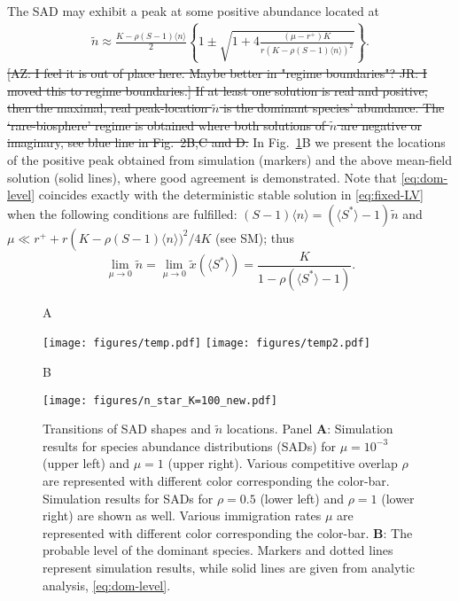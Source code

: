 \documentclass[9pt,twocolumn,twoside,lineno]{pnas-new}
\begin{document}
The SAD may exhibit a peak at some positive abundance %
located at
\begin{eqnarray}
    \label{eq:dom-level}
    \tilde{n}\approx
    \frac{K-\rho(S-1)\langle n\rangle}{2}\left\{1 \pm \sqrt{1+4\frac{(\mu-r^+) K}{r(K-\rho(S-1)\langle n\rangle)^2}}\right\}.
\end{eqnarray}
\st{[AZ: I feel it is out of place here. Maybe better in "regime boundaries"? JR: I moved this to regime boundaries.]
If at least one solution is real and positive, then the maximal, real peak-location $\tilde{n}$ is the dominant species' abundance. 
The `rare-biosphere' regime is obtained where both solutions of $\tilde{n}$ are negative or imaginary, see blue line in Fig.~2B,C and D.}
In Fig.~\ref{fig:Fig3}B we present the locations of the positive peak obtained from simulation (markers) and the above mean-field solution (solid lines), where good agreement is demonstrated.
Note that \eqref{eq:dom-level} coincides exactly with the deterministic stable solution in \eqref{eq:fixed-LV} when the following conditions are fulfilled: $(S-1)\langle n\rangle = (\langle S^* \rangle - 1 ) \tilde{n} $ and $\mu \ll r^++ r\left(K-\rho(S-1)\langle n\rangle)^2 / 4K $ (see SM); thus
\begin{equation}
\lim_{\mu\rightarrow 0}\tilde{n}=\lim_{\mu\rightarrow 0}\tilde{x}\left(\langle S^* \rangle \right) = \frac{K}{1-\rho(\langle S^*\rangle -1)}.
\label{eq:Lim_ss}
\end{equation}

\begin{figure}[t!]
   \begin{flushleft}
        A
   \end{flushleft}
   \texttt{[image: figures/temp.pdf]}
    \texttt{[image: figures/temp2.pdf]}
    \begin{flushleft}
        B
   \end{flushleft}
    \texttt{[image: figures/n\_star\_K=100\_new.pdf]}
    \caption{Transitions of SAD shapes and $\tilde{n}$ locations. Panel \textbf{A}: Simulation results for species abundance distributions (SADs) for $\mu=10^{-3}$ (upper left) and $\mu=1$ (upper right). Various competitive overlap $\rho$ are represented with different color corresponding the color-bar.
     Simulation results for SADs for $\rho=0.5$ (lower left) and $\rho=1$ (lower right) are shown as well. Various immigration rates $\mu$ are represented with different color corresponding the color-bar.
    \textbf{B}: The probable level of the dominant species. Markers and dotted lines represent simulation results, while solid lines are given from analytic analysis, \eqref{eq:dom-level}.         }
 \label{fig:Fig3}
\end{figure}
\end{document}
